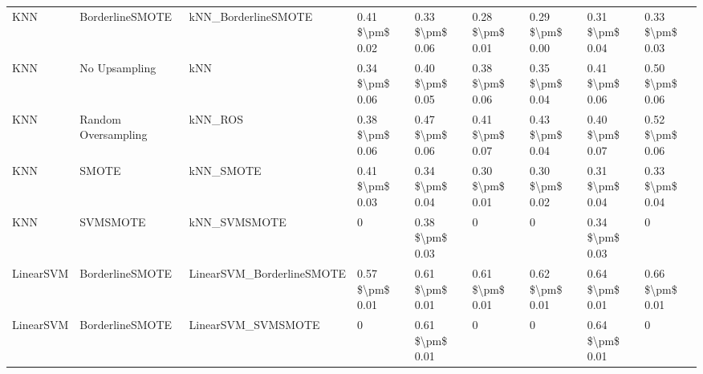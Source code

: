 \begin{tabular}{lllllllll}
                            KNN &               BorderlineSMOTE &                          kNN\_BorderlineSMOTE & 0.41 \$\textbackslash pm\$ 0.02 &           0.33 \$\textbackslash pm\$ 0.06 &       0.28 \$\textbackslash pm\$ 0.01 &        0.29 \$\textbackslash pm\$ 0.00 &                         0.31 \$\textbackslash pm\$ 0.04 &     0.33 \$\textbackslash pm\$ 0.03 \\
                            KNN &                 No Upsampling &                                          kNN & 0.34 \$\textbackslash pm\$ 0.06 &           0.40 \$\textbackslash pm\$ 0.05 &       0.38 \$\textbackslash pm\$ 0.06 &        0.35 \$\textbackslash pm\$ 0.04 &                         0.41 \$\textbackslash pm\$ 0.06 &     0.50 \$\textbackslash pm\$ 0.06 \\
                            KNN &           Random Oversampling &                                      kNN\_ROS & 0.38 \$\textbackslash pm\$ 0.06 &           0.47 \$\textbackslash pm\$ 0.06 &       0.41 \$\textbackslash pm\$ 0.07 &        0.43 \$\textbackslash pm\$ 0.04 &                         0.40 \$\textbackslash pm\$ 0.07 &     0.52 \$\textbackslash pm\$ 0.06 \\
                            KNN &                         SMOTE &                                    kNN\_SMOTE & 0.41 \$\textbackslash pm\$ 0.03 &           0.34 \$\textbackslash pm\$ 0.04 &       0.30 \$\textbackslash pm\$ 0.01 &        0.30 \$\textbackslash pm\$ 0.02 &                         0.31 \$\textbackslash pm\$ 0.04 &     0.33 \$\textbackslash pm\$ 0.04 \\
                            KNN &                      SVMSMOTE &                                 kNN\_SVMSMOTE &               0 &           0.38 \$\textbackslash pm\$ 0.03 &                     0 &                      0 &                         0.34 \$\textbackslash pm\$ 0.03 &                   0 \\
                      LinearSVM &               BorderlineSMOTE &                    LinearSVM\_BorderlineSMOTE & 0.57 \$\textbackslash pm\$ 0.01 &           0.61 \$\textbackslash pm\$ 0.01 &       0.61 \$\textbackslash pm\$ 0.01 &        0.62 \$\textbackslash pm\$ 0.01 &                         0.64 \$\textbackslash pm\$ 0.01 &     0.66 \$\textbackslash pm\$ 0.01 \\
                      LinearSVM &               BorderlineSMOTE &                           LinearSVM\_SVMSMOTE &               0 &           0.61 \$\textbackslash pm\$ 0.01 &                     0 &                      0 &                         0.64 \$\textbackslash pm\$ 0.01 &                   0 \\

\end{tabular}
